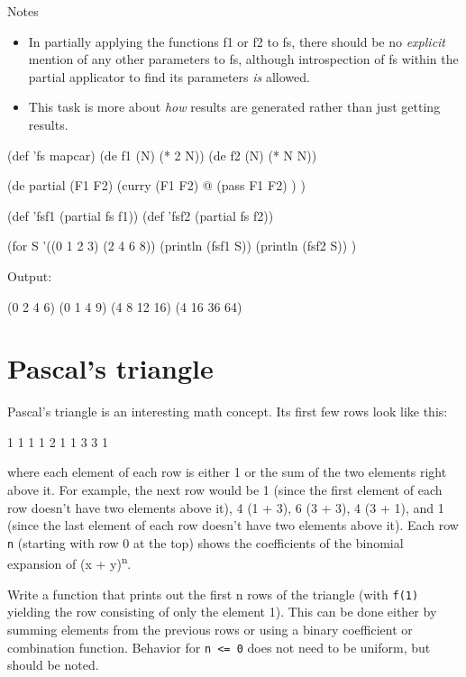 Notes

\begin{itemize}
\item
  In partially applying the functions f1 or f2 to fs, there should be no
  \emph{explicit} mention of any other parameters to fs, although
  introspection of fs within the partial applicator to find its
  parameters \emph{is} allowed.
\item
  This task is more about \emph{how} results are generated rather than
  just getting results.
\end{itemize}


\begin{wideverbatim}

(def 'fs mapcar)
(de f1 (N) (* 2 N))
(de f2 (N) (* N N))

(de partial (F1 F2)
   (curry (F1 F2) @
      (pass F1 F2) ) )

(def 'fsf1 (partial fs f1))
(def 'fsf2 (partial fs f2))

(for S '((0 1 2 3) (2 4 6 8))
   (println (fsf1 S))
   (println (fsf2 S)) )

Output:

(0 2 4 6)
(0 1 4 9)
(4 8 12 16)
(4 16 36 64)

\end{wideverbatim}

\pagebreak{}
\section*{Pascal's triangle}


Pascal's triangle is an interesting math concept. Its first few rows
look like this:

\begin{wideverbatim}
   1
  1 1
 1 2 1
1 3 3 1
\end{wideverbatim}

where each element of each row is either 1 or the sum of the two
elements right above it. For example, the next row would be 1 (since the
first element of each row doesn't have two elements above it), 4 (1 +
3), 6 (3 + 3), 4 (3 + 1), and 1 (since the last element of each row
doesn't have two elements above it). Each row \texttt{n} (starting with
row 0 at the top) shows the coefficients of the binomial expansion of (x
+ y)\textsuperscript{n}.

Write a function that prints out the first n rows of the triangle (with
\texttt{f(1)} yielding the row consisting of only the element 1). This
can be done either by summing elements from the previous rows or using a
binary coefficient or combination function. Behavior for
\texttt{n \textless{}= 0} does not need to be uniform, but should be
noted.



